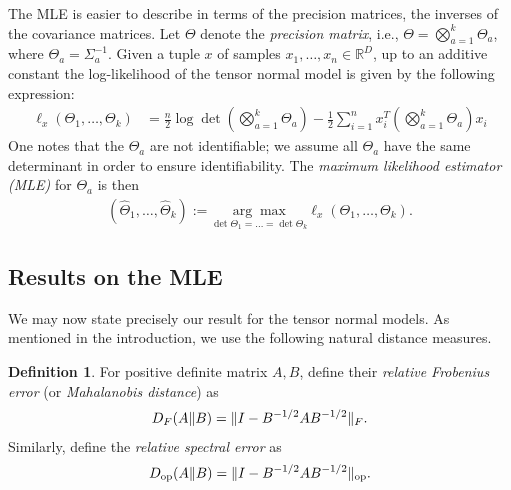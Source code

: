 \documentclass[aos]{imsart}
\theoremstyle{definition}
\newtheorem{definition}[theorem]{Definition}
\numberwithin{equation}{section}
\DeclareMathOperator{\op}{op}
\DeclarePairedDelimiter{\norm}{\lVert}{\rVert}
\newcommand{\R}{{\mathbb{R}}}
\newcommand{\samp}{x}
\begin{document}
The MLE is easier to describe in terms of the precision matrices, the inverses of the covariance matrices.
Let $\Theta$ denote the \emph{precision matrix}, i.e., $\Theta = \bigotimes_{a=1}^k \Theta_a$, where $\Theta_a = \Sigma_a^{-1}$.
Given a tuple $x$ of samples $\samp_1,\dots,\samp_n\in\R^D$, up to an additive constant the log-likelihood of the tensor normal model is given by the following expression:
\begin{align*}
  \ell_x(\Theta_1, \dots, \Theta_k)
&= \frac n 2 \log \det \left( \textstyle\bigotimes_{a=1}^k \Theta_a \right)  - \frac12 \sum_{i=1}^n x_i^T \left( \textstyle\bigotimes_{a=1}^k \Theta_a \right) x_i
\end{align*}
One notes that the $\Theta_a$ are not identifiable; we assume all $\Theta_a$ have the same determinant in order to ensure identifiability.
The \emph{maximum likelihood estimator (MLE)} for $\Theta_a$ is then
\begin{align}\label{eq:mle}
  (\widehat{\Theta}_1, \dots, \widehat{\Theta}_k) := \underset{\det \Theta_1 = \dots = \det \Theta_k}{ \arg\max} \ell_x(\Theta_1, \dots, \Theta_k).
\end{align}

\subsection{Results on the MLE}
We may now state precisely our result for the tensor normal models.
As mentioned in the introduction, we use the following natural distance measures.

\begin{definition}
For positive definite matrix $A, B$, define their \emph{relative Frobenius error} (or \emph{Mahalanobis distance}) as
\begin{align*}
  D_F(A \Vert B) = \norm{I - B^{-1/2} A B^{-1/2}}_F.
\end{align*}
Similarly, define the \emph{relative spectral error} as
\begin{align*}
  D_{\op}(A \Vert B) = \norm{I - B^{-1/2} A B^{-1/2}}_{\op}.
\end{align*}
\end{definition}
\end{document}
